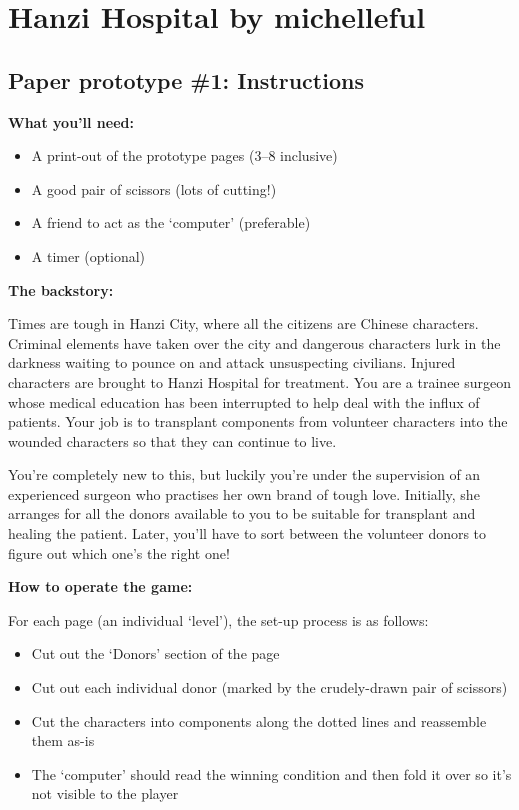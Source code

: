 \documentclass{article}
\begin{document}
\section*{Hanzi Hospital by michelleful}
\subsection*{Paper prototype \#1: Instructions}

\bigskip\bigskip

\textbf{What you'll need:}
\begin{itemize}
  \item A print-out of the prototype pages (3--8 inclusive)
  \item A good pair of scissors (lots of cutting!)
  \item A friend to act as the `computer' (preferable)
  \item A timer (optional)
\end{itemize}

\bigskip

\noindent\textbf{The backstory:}

 Times are tough in Hanzi City, where all the citizens are Chinese characters. Criminal elements have taken over the city and dangerous characters lurk in the darkness waiting to pounce on and attack unsuspecting civilians. Injured characters are brought to Hanzi Hospital for treatment. You are a trainee surgeon whose medical education has been interrupted to help deal with the influx of patients. Your job is to transplant components from volunteer characters into the wounded characters so that they can continue to live.
 
You're completely new to this, but luckily you're under the supervision of an experienced surgeon who practises her own brand of tough love. Initially, she arranges for all the donors available to you to be suitable for transplant and healing the patient. Later, you'll have to sort between the volunteer donors to figure out which one's the right one!

\bigskip

\noindent\textbf{How to operate the game:}

For each page (an individual `level'), the set-up process is as follows:

\begin{itemize}
  \item Cut out the `Donors' section of the page
  \item Cut out each individual donor (marked by the crudely-drawn pair of scissors)
  \item Cut the characters into components along the dotted lines and reassemble them as-is
  \item The `computer' should read the winning condition and then fold it over so it's not visible to the player
\end{itemize}
\end{document}

